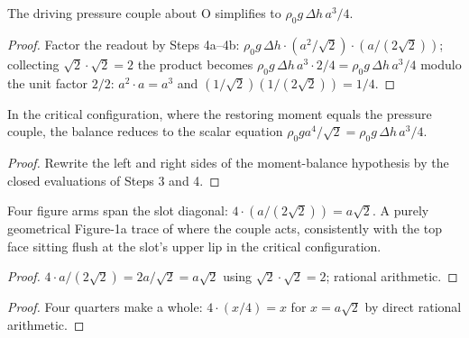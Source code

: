 \begin{lemma}
\label{lem:IPhO2026Problems_problem_IPhO_2026_1_A_1:pressure_couple_eq}
The driving pressure couple about O simplifies to
$\rho_0 g\, \Delta h\, a^3/4$.
\end{lemma}
\begin{proof}
Factor the readout by Steps 4a--4b:
$\rho_0 g\, \Delta h \cdot (a^2/\sqrt{2}) \cdot (a/(2\sqrt{2}))$;
collecting $\sqrt{2}\cdot\sqrt{2} = 2$ the product becomes
$\rho_0 g\, \Delta h\, a^3 \cdot 2/4 = \rho_0 g\, \Delta h\, a^3/4$ modulo
the unit factor $2/2$: $a^2\cdot a = a^3$ and
$(1/\sqrt{2})(1/(2\sqrt{2})) = 1/4$.
\end{proof}

\begin{lemma}
\label{lem:IPhO2026Problems_problem_IPhO_2026_1_A_1:critical_balance_eq}
In the critical configuration, where the restoring moment equals the pressure
couple, the balance reduces to the scalar equation
$\rho_0 g a^4/\sqrt{2} = \rho_0 g\, \Delta h\, a^3/4$.
\end{lemma}
\begin{proof}
Rewrite the left and right sides of the moment-balance hypothesis by the
closed evaluations of Steps 3 and 4.
\end{proof}

\begin{lemma}
\label{lem:IPhO2026Problems_problem_IPhO_2026_1_A_1:pressure_couple_position_trace}
Four figure arms span the slot diagonal:
$4 \cdot (a/(2\sqrt{2})) = a\sqrt{2}$.  A purely geometrical Figure-1a
trace of where the couple acts, consistently with the top face sitting
flush at the slot's upper lip in the critical configuration.
\end{lemma}
\begin{proof}
$4 \cdot a/(2\sqrt{2}) = 2a/\sqrt{2} = a\sqrt{2}$ using
$\sqrt{2}\cdot\sqrt{2} = 2$; rational arithmetic.
\end{proof}
\begin{proof}
Four quarters make a whole: $4 \cdot (x/4) = x$ for $x = a\sqrt{2}$ by direct
rational arithmetic.
\end{proof}

